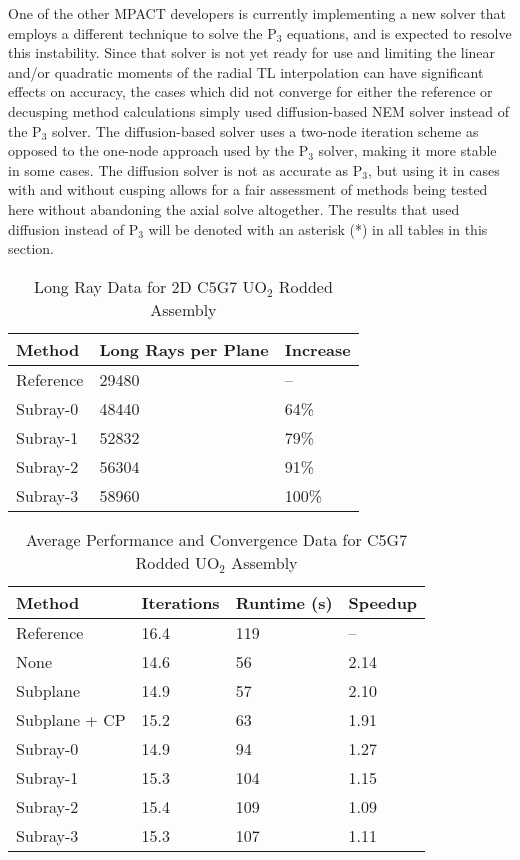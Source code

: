 One of the other MPACT developers is currently implementing a new solver that employs a different technique to solve the P$_3$ equations, and is expected to resolve this instability.  Since that solver is not yet ready for use and limiting the linear and/or quadratic moments of the radial TL interpolation can have significant effects on accuracy, the cases which did not converge for either the reference or decusping method calculations simply used diffusion-based NEM solver instead of the P$_3$ solver.  The diffusion-based solver uses a two-node iteration scheme as opposed to the one-node approach used by the P$_3$ solver, making it more stable in some cases.  The diffusion solver is not as accurate as P$_3$, but using it in cases with and without cusping allows for a fair assessment of methods being tested here without abandoning the axial solve altogether.  The results that used diffusion instead of P$_3$ will be denoted with an asterisk (*) in all tables in this section.

\begin{table}[h]
    \centering
    \caption{Long Ray Data for 2D C5G7 UO\texorpdfstring{$_2$}{2} Rodded Assembly}\label{t:subray-data-2dassembly}
    \begin{tabular}{l l l}\toprule
        Method & Long Rays per Plane & Increase \\\midrule
        Reference & 29480 & -- \\
        Subray-0 & 48440 & 64\% \\
        Subray-1 & 52832 & 79\% \\
        Subray-2 & 56304 & 91\% \\
        Subray-3 & 58960 & 100\% \\
        \bottomrule
    \end{tabular}
\end{table}

\begin{table}[h]
    \centering
    \caption{Average Performance and Convergence Data for C5G7 Rodded UO\texorpdfstring{$_2$}{2} Assembly}\label{t:subray-performance-2dassembly}
    \begin{tabular}{l l l l}\toprule
        Method & Iterations & Runtime (s) & Speedup \\\midrule
Reference     & 16.4 & 119 & --   \\
None          & 14.6 & 56 & 2.14 \\
Subplane      & 14.9 & 57 & 2.10 \\
Subplane + CP & 15.2 & 63 & 1.91 \\
Subray-0      & 14.9 & 94 & 1.27  \\
Subray-1      & 15.3 & 104 & 1.15 \\ 
Subray-2      & 15.4 & 109 & 1.09 \\ 
Subray-3      & 15.3 & 107 & 1.11 \\ 
        \bottomrule
    \end{tabular}
\end{table}

